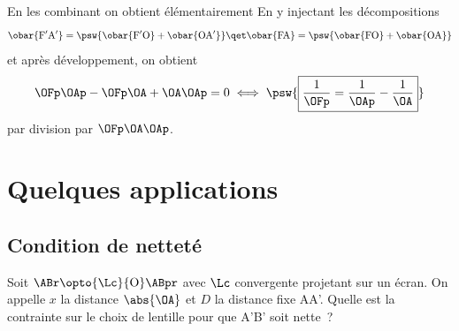 \documentclass[../../main/main.tex]{subfiles}
\begin{document}
\begin{tcb}[label=demo:lent_rc, breakable]
\begin{isd}
	\end{isd}
	En les combinant on obtient élémentairement
	En y injectant les décompositions
	\begin{equation*}
		\obar{\rm F'A'} = \psw{
			\obar{\rm F'O} + \obar{\rm OA'}
		}
		\qet
		\obar{\rm FA} = \psw{
			\obar{\rm FO} + \obar{\rm OA}
		}
	\end{equation*}
	et après développement, on obtient
	\begin{equation*}
		\OFp\OAp - \OFp\OA + \OA\OAp = 0
		\iff
		\psw{
			\boxed{
				\frac{1}{\OFp} = \frac{1}{\OAp} - \frac{1}{\OA}
			}
		}
	\end{equation*}
	par division par $\OFp\OA\OAp$.
\end{tcb}

\section{Quelques applications}

\subsection{Condition de netteté}

Soit $\ABr \opto{\Lc}{\rm O} \ABpr$ avec $\Lc$ convergente projetant sur un écran. On
appelle $x$ la distance $ \abs{\OA}$ et $D$ la distance fixe AA'.
Quelle est la contrainte sur le choix de lentille pour que A'B' soit nette~?
\end{document}
